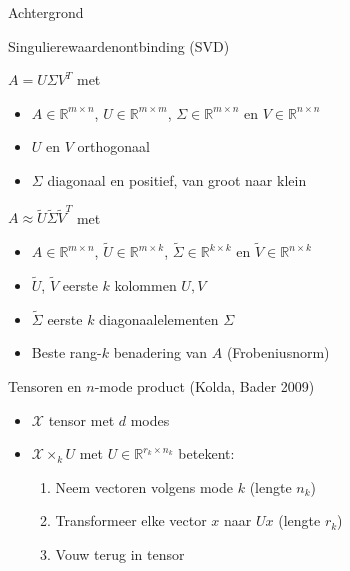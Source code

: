 \documentclass[t,12pt,dutch
\ifx\beamermode\undefined\else,\beamermode\fi
]{beamer}
\begin{document}
\begin{frame}{}
\begin{center}
\vspace*{\fill}
\vspace*{\fill}
\Huge
Achtergrond
\normalsize
\vspace*{\fill}
\end{center}
\end{frame}

\begin{frame}{Singulierewaardenontbinding (SVD)}

$A = U \Sigma V^T$ met 
\begin{itemize}
\item $A \in \mathbb{R}^{m \times n}$, $U \in \mathbb{R}^{m \times m}$, $\Sigma \in \mathbb{R}^{m \times n}$ en $V \in \mathbb{R}^{n \times n}$
\item $U$ en $V$ orthogonaal
\item $\Sigma$ diagonaal en positief, van groot naar klein
\newline
\end{itemize}
$A \approx \widetilde{U} \widetilde{\Sigma} \widetilde{V}^T$ met 
\begin{itemize}
\item $A \in \mathbb{R}^{m \times n}$, $\widetilde{U} \in \mathbb{R}^{m \times k}$, $\widetilde{\Sigma} \in \mathbb{R}^{k \times k}$ en $\widetilde{V} \in \mathbb{R}^{n \times k}$
\item $\widetilde{U}$, $\widetilde{V}$ eerste $k$ kolommen $U, V$
\item $\widetilde{\Sigma}$ eerste $k$ diagonaalelementen $\Sigma$
\item Beste rang-$k$ benadering van $A$ (Frobeniusnorm)
\end{itemize}

\end{frame}

\begin{frame}{Tensoren en $n$-mode product (Kolda, Bader 2009)}

\begin{itemize}
\item $\mathscr{X}$ tensor met $d$ modes
\item $\mathscr{X} \times_k U$ met $U \in \mathbb{R}^{r_k \times n_k}$ betekent:
\begin{enumerate}
\item Neem vectoren volgens mode $k$ (lengte $n_k$)
\item Transformeer elke vector $x$ naar $Ux$ (lengte $r_k$)
\item Vouw terug in tensor
\end{enumerate}
\end{itemize}

\end{frame}
\end{document}
